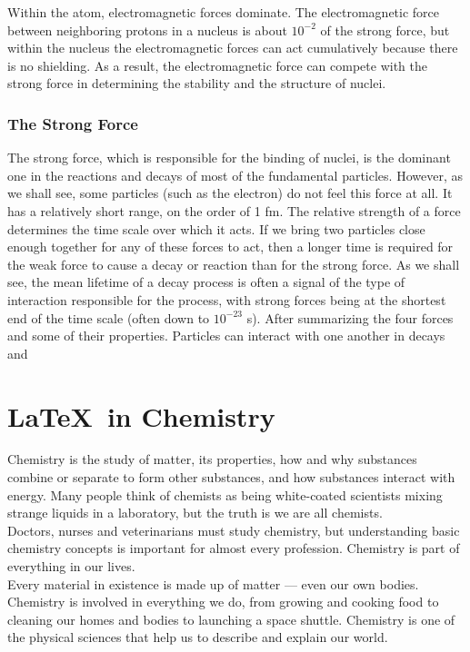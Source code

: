 \documentclass[12pt, a4paper]{article}
\begin{document}
\noindent
Within the atom, electromagnetic forces dominate. The electromagnetic
force between neighboring protons in a nucleus is about $10^{-2}$ of the strong
force, but within the nucleus the electromagnetic forces can act cumulatively
because there is no shielding. As a result, the electromagnetic force can compete
with the strong force in determining the stability and the structure of nuclei.

\subsubsection*{The Strong Force }  The strong force, which is responsible for the binding of
nuclei, is the dominant one in the reactions and decays of most of the fundamental
particles. However, as we shall see, some particles (such as the electron) do not
feel this force at all. It has a relatively short range, on the order of 1 fm.
The relative strength of a force determines the time scale over which it acts. If
we bring two particles close enough together for any of these forces to act, then
a longer time is required for the weak force to cause a decay or reaction than for
the strong force. As we shall see, the mean lifetime of a decay process is often
a signal of the type of interaction responsible for the process, with strong forces
being at the shortest end of the time scale (often down to $10^{-23}$ s). After
summarizing the four forces and some of their properties.
Particles can interact with one another in decays and
\pagebreak

\section*{\LaTeX\  in Chemistry}
Chemistry is the study of matter, its properties, how and why substances combine or separate to form other substances, and how substances interact with energy. Many people think of chemists as being white-coated scientists mixing strange liquids in a laboratory, but the truth is we are all chemists. \\
\noindent
Doctors, nurses and veterinarians must study chemistry, but understanding basic chemistry concepts is important for almost every profession. Chemistry is part of everything in our lives. \\
\noindent
Every material in existence is made up of matter — even our own bodies. Chemistry is involved in everything we do, from growing and cooking food to cleaning our homes and bodies to launching a space shuttle. Chemistry is one of the physical sciences that help us to describe and explain our world.
\end{document}
